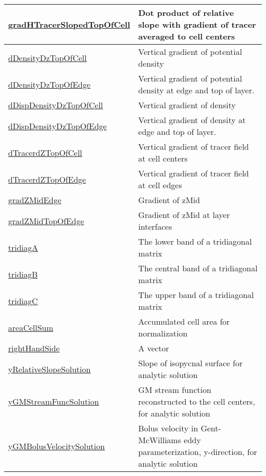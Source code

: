 {\begin{center}
\begin{longtable}{| p{2.0in} | p{4.0in} |}
	\hline
	\hyperref[subsec:var_sec_scratch_gradHTracerSlopedTopOfCell]{gradHTracerSlopedTopOfCell} & Dot product of relative slope with gradient of tracer averaged to cell centers \\
	\hline
	\hyperref[subsec:var_sec_scratch_dDensityDzTopOfCell]{dDensityDzTopOfCell} & Vertical gradient of potential density \\
	\hline
	\hyperref[subsec:var_sec_scratch_dDensityDzTopOfEdge]{dDensityDzTopOfEdge} & Vertical gradient of potential density at edge and top of layer. \\
	\hline
	\hyperref[subsec:var_sec_scratch_dDispDensityDzTopOfCell]{dDispDensityDzTopOfCell} & Vertical gradient of density \\
	\hline
	\hyperref[subsec:var_sec_scratch_dDispDensityDzTopOfEdge]{dDispDensityDzTopOfEdge} & Vertical gradient of density at edge and top of layer. \\
	\hline
	\hyperref[subsec:var_sec_scratch_dTracerdZTopOfCell]{dTracerdZTopOfCell} & Vertical gradient of tracer field at cell centers \\
	\hline
	\hyperref[subsec:var_sec_scratch_dTracerdZTopOfEdge]{dTracerdZTopOfEdge} & Vertical gradient of tracer field at cell edges \\
	\hline
	\hyperref[subsec:var_sec_scratch_gradZMidEdge]{gradZMidEdge} & Gradient of zMid \\
	\hline
	\hyperref[subsec:var_sec_scratch_gradZMidTopOfEdge]{gradZMidTopOfEdge} & Gradient of zMid at layer interfaces \\
	\hline
	\hyperref[subsec:var_sec_scratch_tridiagA]{tridiagA} & The lower band of a tridiagonal matrix \\
	\hline
	\hyperref[subsec:var_sec_scratch_tridiagB]{tridiagB} & The central band of a tridiagonal matrix \\
	\hline
	\hyperref[subsec:var_sec_scratch_tridiagC]{tridiagC} & The upper band of a tridiagonal matrix \\
	\hline
	\hyperref[subsec:var_sec_scratch_areaCellSum]{areaCellSum} & Accumulated cell area for normalization \\
	\hline
	\hyperref[subsec:var_sec_scratch_rightHandSide]{rightHandSide} & A vector \\
	\hline
	\hyperref[subsec:var_sec_scratch_yRelativeSlopeSolution]{yRelativeSlopeSolution} & Slope of isopycnal surface for analytic solution \\
	\hline
	\hyperref[subsec:var_sec_scratch_yGMStreamFuncSolution]{yGMStreamFuncSolution} & GM stream function reconstructed to the cell centers, for analytic solution \\
	\hline
	\hyperref[subsec:var_sec_scratch_yGMBolusVelocitySolution]{yGMBolusVelocitySolution} & Bolus velocity in Gent-McWilliams eddy parameterization, y-direction, for analytic solution \\
	\hline
\end{longtable}
\end{center}
}
